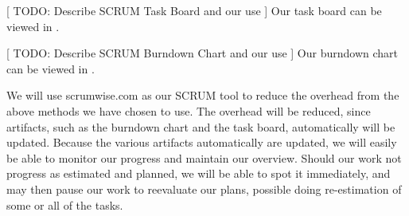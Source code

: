 [ TODO: Describe SCRUM Task Board and our use ]
Our task board can be viewed in .

[ TODO: Describe SCRUM Burndown Chart and our use ]
Our burndown chart can be viewed in .

We will use scrumwise.com as our SCRUM tool to reduce the overhead from the above methods we have chosen to use. The overhead will be reduced, since artifacts, such as the burndown chart and the task board, automatically will be updated.
Because the various artifacts automatically are updated, we will easily be able to monitor our progress and maintain our overview. Should our work not progress as estimated and planned, we will be able to spot it immediately, and may then pause our work to reevaluate our plans, possible doing re-estimation of some or all of the tasks.